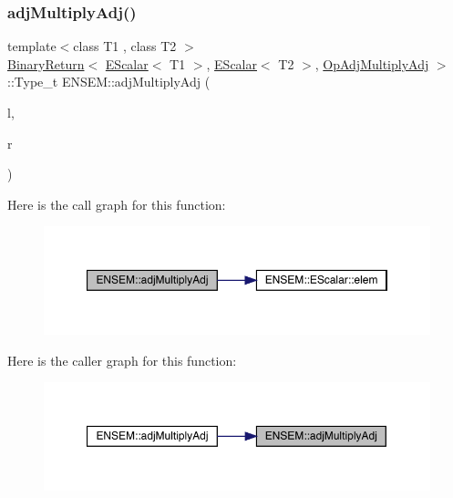 \subsubsection{\texorpdfstring{adjMultiplyAdj()}{adjMultiplyAdj()}}
{\footnotesize\ttfamily template$<$class T1 , class T2 $>$ \\
\mbox{\hyperlink{structENSEM_1_1BinaryReturn}{Binary\+Return}}$<$ \mbox{\hyperlink{classENSEM_1_1EScalar}{E\+Scalar}}$<$ T1 $>$, \mbox{\hyperlink{classENSEM_1_1EScalar}{E\+Scalar}}$<$ T2 $>$, \mbox{\hyperlink{structENSEM_1_1OpAdjMultiplyAdj}{Op\+Adj\+Multiply\+Adj}} $>$\+::Type\+\_\+t E\+N\+S\+E\+M\+::adj\+Multiply\+Adj (\begin{DoxyParamCaption}\item[{const \mbox{\hyperlink{classENSEM_1_1EScalar}{E\+Scalar}}$<$ T1 $>$ \&}]{l,  }\item[{const \mbox{\hyperlink{classENSEM_1_1EScalar}{E\+Scalar}}$<$ T2 $>$ \&}]{r }\end{DoxyParamCaption})\hspace{0.3cm}{\ttfamily [inline]}}

Here is the call graph for this function\+:\nopagebreak
\begin{figure}[H]
\begin{center}
\leavevmode
\includegraphics[width=350pt]{d4/dca/group__escalar_gab3c0c146aa415c32cb9ce5a6ad426d10_cgraph}
\end{center}
\end{figure}
Here is the caller graph for this function\+:\nopagebreak
\begin{figure}[H]
\begin{center}
\leavevmode
\includegraphics[width=350pt]{d4/dca/group__escalar_gab3c0c146aa415c32cb9ce5a6ad426d10_icgraph}
\end{center}
\end{figure}
\mbox{\label{group__escalar_gab463bdb3f1fadf6b5a87076e5d3dc9b9}} 
